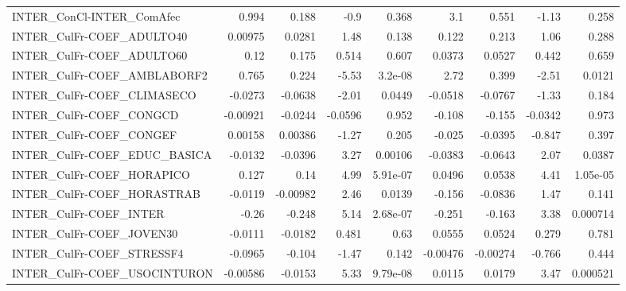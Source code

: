 \begin{tabular}{lrrrrrrrr}
INTER\_ConCl-INTER\_ComAfec             &       0.994 &        0.188 &     -0.9 &    0.368 &        3.1 &       0.551 &        -1.13 &         0.258 \\
INTER\_CulFr-COEF\_ADULTO40             &     0.00975 &       0.0281 &     1.48 &    0.138 &      0.122 &       0.213 &         1.06 &         0.288 \\
INTER\_CulFr-COEF\_ADULTO60             &        0.12 &        0.175 &    0.514 &    0.607 &     0.0373 &      0.0527 &        0.442 &         0.659 \\
INTER\_CulFr-COEF\_AMBLABORF2           &       0.765 &        0.224 &    -5.53 &  3.2e-08 &       2.72 &       0.399 &        -2.51 &        0.0121 \\
INTER\_CulFr-COEF\_CLIMASECO            &     -0.0273 &      -0.0638 &    -2.01 &   0.0449 &    -0.0518 &     -0.0767 &        -1.33 &         0.184 \\
INTER\_CulFr-COEF\_CONGCD               &    -0.00921 &      -0.0244 &  -0.0596 &    0.952 &     -0.108 &      -0.155 &      -0.0342 &         0.973 \\
INTER\_CulFr-COEF\_CONGEF               &     0.00158 &      0.00386 &    -1.27 &    0.205 &     -0.025 &     -0.0395 &       -0.847 &         0.397 \\
INTER\_CulFr-COEF\_EDUC\_BASICA          &     -0.0132 &      -0.0396 &     3.27 &  0.00106 &    -0.0383 &     -0.0643 &         2.07 &        0.0387 \\
INTER\_CulFr-COEF\_HORAPICO             &       0.127 &         0.14 &     4.99 & 5.91e-07 &     0.0496 &      0.0538 &         4.41 &      1.05e-05 \\
INTER\_CulFr-COEF\_HORASTRAB            &     -0.0119 &     -0.00982 &     2.46 &   0.0139 &     -0.156 &     -0.0836 &         1.47 &         0.141 \\
INTER\_CulFr-COEF\_INTER                &       -0.26 &       -0.248 &     5.14 & 2.68e-07 &     -0.251 &      -0.163 &         3.38 &      0.000714 \\
INTER\_CulFr-COEF\_JOVEN30              &     -0.0111 &      -0.0182 &    0.481 &     0.63 &     0.0555 &      0.0524 &        0.279 &         0.781 \\
INTER\_CulFr-COEF\_STRESSF4             &     -0.0965 &       -0.104 &    -1.47 &    0.142 &   -0.00476 &    -0.00274 &       -0.766 &         0.444 \\
INTER\_CulFr-COEF\_USOCINTURON          &    -0.00586 &      -0.0153 &     5.33 & 9.79e-08 &     0.0115 &      0.0179 &         3.47 &      0.000521 \\

\end{tabular}
